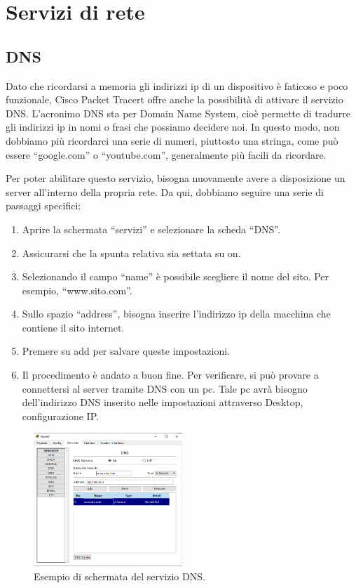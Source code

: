 \section{Servizi di rete}
\subsection{DNS}
Dato che ricordarsi a memoria gli indirizzi ip di un dispositivo è faticoso e poco funzionale, Cisco Packet Tracert offre anche la possibilità di attivare il servizio DNS. L’acronimo DNS sta per Domain Name System, cioè permette di tradurre gli indirizzi ip in nomi o frasi che possiamo decidere noi. In questo modo, non dobbiamo più ricordarci una serie di numeri, piuttosto una stringa, come può essere “google.com” o “youtube.com”, generalmente più facili da ricordare.

Per poter abilitare questo servizio, bisogna nuovamente avere a disposizione un server all’interno della propria rete. Da qui, dobbiamo seguire una serie di passaggi specifici:

\begin{enumerate}
    \item Aprire la schermata “servizi” e selezionare la scheda “DNS”.
    \item Assicurarsi che la spunta relativa sia settata su on.
    \item Selezionando il campo “name” è possibile scegliere il nome del sito. Per esempio, “www.sito.com”.
    \item Sullo spazio “address”, bisogna inserire l’indirizzo ip della macchina che contiene il sito internet.
    \item Premere su add per salvare queste impostazioni.
    \item Il procedimento è andato a buon fine. Per verificare, si può provare a connettersi al server tramite DNS con un pc. Tale pc avrà bisogno dell’indirizzo DNS inserito nelle impostazioni attraverso Desktop, configurazione IP.
\end{enumerate}

\begin{figure}[htbp]
    \centering
    \includegraphics[width=0.5\textwidth]{images/06.servizi-rete/dns/01.conf-server.png}
    \caption{Esempio di schermata del servizio DNS.}
    \label{fig:dns-conf-server}
\end{figure}


